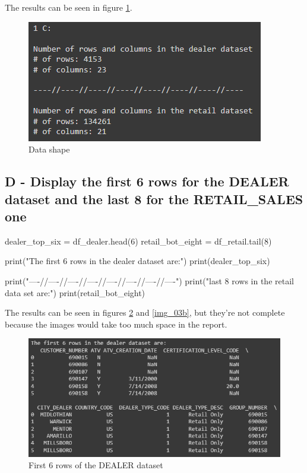 \documentclass[a4paper, 12pt]{article}
\begin{document}
The results can be seen in figure \ref{img_02}.

\begin{figure}[!htb]
	\caption{\label{img_02} Data shape}
	\begin{center}
		\includegraphics[scale=1.10]{img_02.PNG}
	\end{center}
\end{figure}

\subsection{D - Display the first 6 rows for the DEALER dataset and the last 8 for the RETAIL\_SALES one}

\begin{python}
	dealer_top_six = df_dealer.head(6)
	retail_bot_eight = df_retail.tail(8)
\end{python}

\begin{python}
	print("The first 6 rows in the dealer dataset are:")
	print(dealer_top_six)
	
	print("\n----//----//----//----//----//----//----//----")
	print("\nThe last 8 rows in the retail data set are:")
	print(retail_bot_eight)
\end{python}

The results can be seen in figures \ref{img_03a} and \ref{img_03b}, but they're not complete because the images would take too much space in the report.

\begin{figure}[!htb]
	\caption{\label{img_03a} First 6 rows of the DEALER dataset}
	\begin{center}
		\includegraphics[scale=0.8]{img_03a.PNG}
	\end{center}
\end{figure}
\end{document}

